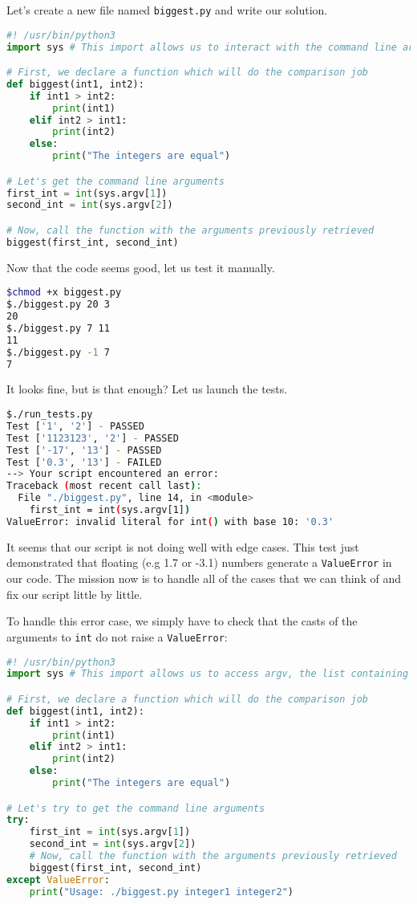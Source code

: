 \documentclass[12pt]{article}
\begin{document}
Let's create a new file named \texttt{biggest.py} and write our solution.

\begin{lstlisting}[language=python,style=codestyle,title=biggest.py]
#! /usr/bin/python3
import sys # This import allows us to interact with the command line arguments

# First, we declare a function which will do the comparison job
def biggest(int1, int2):
    if int1 > int2:
        print(int1)
    elif int2 > int1:
        print(int2)
    else:
        print("The integers are equal")

# Let's get the command line arguments
first_int = int(sys.argv[1])
second_int = int(sys.argv[2])

# Now, call the function with the arguments previously retrieved
biggest(first_int, second_int)
\end{lstlisting}

Now that the code seems good, let us test it manually.

\begin{lstlisting}[language=bash]
$chmod +x biggest.py
$./biggest.py 20 3
20
$./biggest.py 7 11
11
$./biggest.py -1 7
7
\end{lstlisting}

It looks fine, but is that enough? Let us launch the tests.

\begin{lstlisting}[language=bash]
$./run_tests.py
Test ['1', '2'] - PASSED
Test ['1123123', '2'] - PASSED
Test ['-17', '13'] - PASSED
Test ['0.3', '13'] - FAILED
--> Your script encountered an error: 
Traceback (most recent call last):
  File "./biggest.py", line 14, in <module>
    first_int = int(sys.argv[1])
ValueError: invalid literal for int() with base 10: '0.3'
\end{lstlisting}

It seems that our script is not doing well with edge cases. This test just demonstrated that floating (e.g 1.7 or -3.1) numbers generate a \texttt{ValueError} in our code.
The mission now is to handle all of the cases that we can think of and fix our script little by little.

To handle this error case, we simply have to check that the casts of the arguments to \texttt{int} do not raise a \texttt{ValueError}:

\begin{lstlisting}[language=python,style=codestyle,title=biggest.py]
#! /usr/bin/python3
import sys # This import allows us to access argv, the list containing the command line arguments

# First, we declare a function which will do the comparison job
def biggest(int1, int2):
    if int1 > int2:
        print(int1)
    elif int2 > int1:
        print(int2)
    else:
        print("The integers are equal")

# Let's try to get the command line arguments
try:
    first_int = int(sys.argv[1])
    second_int = int(sys.argv[2])
    # Now, call the function with the arguments previously retrieved
    biggest(first_int, second_int)
except ValueError:
    print("Usage: ./biggest.py integer1 integer2")
\end{lstlisting}
\end{document}
